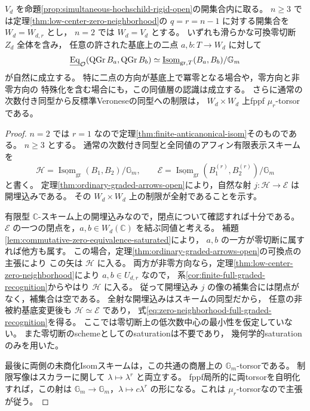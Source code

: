 \begin{corollary}[可換零切断近傍における通常次数付き表示の全同値認識]
\label{cor:zero-neighborhood-full-graded-recognition}
$V_d$ を命題\ref{prop:simultaneous-hochschild-rigid-open}の開集合内に取る。
$n\ge3$ では定理\ref{thm:low-center-zero-neighborhood}の $q=r=n-1$ に対する開集合を $W_d=W_{d,r}$ とし，
$n=2$ では $W_d=V_d$ とする。
いずれも滑らかな可換零切断 $Z_d$ 全体を含み，
任意の許された基底上の二点 $a,b:T\to W_d$ に対して
\begin{equation}\label{eq:zero-neighborhood-full-graded-recognition}
 \underline{\operatorname{Eq}}_{\mathcal O}(\operatorname{QGr} B_a,\operatorname{QGr} B_b)
 \simeq
 \underline{\operatorname{Isom}}_{\mathrm{gr},T}(B_a,B_b)/\mathbb G_m
\end{equation}
が自然に成立する。
特に二点の方向が基底上で冪零となる場合や，零方向と非零方向の
特殊化を含む場合にも，この同値層の認識は成立する。
さらに通常の次数付き同型から反標準Veroneseの同型への制限は，
$W_d\times W_d$ 上fppf $\mu_r$-torsorである。
\end{corollary}
\begin{proof}
$n=2$ では $r=1$ なので定理\ref{thm:finite-anticanonical-isom}そのものである。
$n\ge3$ とする。
通常の次数付き同型と全同値のアフィン有限表示スキームを
\[
 \mathcal H=
  \underline{\operatorname{Isom}}_{\mathrm{gr}}(B_1,B_2)/\mathbb G_m,
 \qquad
 \mathcal E=
  \underline{\operatorname{Isom}}_{\mathrm{gr}}(B_1^{(r)},B_2^{(r)})/\mathbb G_m
\]
と書く。
定理\ref{thm:ordinary-graded-arrows-open}により，自然な射
$j:\mathcal H\to\mathcal E$ は開埋込みである。
その $W_d\times W_d$ 上の制限が全射であることを示す。

有限型 $\mathbb C$-スキーム上の開埋込みなので，閉点について確認すれば十分である。
$\mathcal E$ の一つの閉点を，$a,b\in W_d(\mathbb C)$ を結ぶ同値と考える。
補題\ref{lem:commutative-zero-equivalence-saturated}により，
$a,b$ の一方が零切断に属すれば他方も属す。
この場合，定理\ref{thm:ordinary-graded-arrows-open}の可換点の主張により
この矢は $\mathcal H$ に入る。
両方が非零方向なら，定理\ref{thm:low-center-zero-neighborhood}により $a,b\in U_{d,r}$ なので，
系\ref{cor:finite-full-graded-recognition}からやはり $\mathcal H$ に入る。
従って開埋込み $j$ の像の補集合には閉点がなく，補集合は空である。
全射な開埋込みはスキームの同型だから，
任意の非被約基底変更後も $\mathcal H\simeq\mathcal E$ であり，
式\eqref{eq:zero-neighborhood-full-graded-recognition}を得る。
ここでは零切断上の低次数中心の最小性を仮定していない。
また零切断のschemeとしてのsaturationは不要であり，
幾何学的saturationのみを用いた。

最後に両側の未商化Isomスキームは，この共通の商層上の
$\mathbb G_m$-torsorである。
制限写像はスカラーに関して $\lambda\mapsto\lambda^r$ と両立する。
fppf局所的に両torsorを自明化すれば，この射は
$\mathbb G_m\to\mathbb G_m$，$\lambda\mapsto c\lambda^r$
の形になる。これは $\mu_r$-torsorなので主張が従う。
\end{proof}

